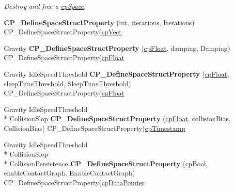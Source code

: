 \begin{DoxyCompactItemize}
\begin{DoxyCompactList}\small\item\em Destroy and free a \hyperlink{structcp_space}{cp\-Space}. \end{DoxyCompactList}\item 
\hypertarget{group__cp_space_ga4416ec77788a87c64524241af22d2913}{{\bfseries C\-P\-\_\-\-Define\-Space\-Struct\-Property} (int, iterations, Iterations) C\-P\-\_\-\-Define\-Space\-Struct\-Property(\hyperlink{structcp_vect}{cp\-Vect}}\label{group__cp_space_ga4416ec77788a87c64524241af22d2913}

\item 
\hypertarget{group__cp_space_ga053a4557b7b4775e12a312dfe5160fb7}{Gravity {\bfseries C\-P\-\_\-\-Define\-Space\-Struct\-Property} (\hyperlink{group__basic_types_gac1ed65573e035bf892505768c852d8d3}{cp\-Float}, damping, Damping) C\-P\-\_\-\-Define\-Space\-Struct\-Property(\hyperlink{group__basic_types_gac1ed65573e035bf892505768c852d8d3}{cp\-Float}}\label{group__cp_space_ga053a4557b7b4775e12a312dfe5160fb7}

\item 
\hypertarget{group__cp_space_gaa3bbaa447a85daca643352590001665b}{Gravity Idle\-Speed\-Threshold {\bfseries C\-P\-\_\-\-Define\-Space\-Struct\-Property} (\hyperlink{group__basic_types_gac1ed65573e035bf892505768c852d8d3}{cp\-Float}, sleep\-Time\-Threshold, Sleep\-Time\-Threshold) C\-P\-\_\-\-Define\-Space\-Struct\-Property(\hyperlink{group__basic_types_gac1ed65573e035bf892505768c852d8d3}{cp\-Float}}\label{group__cp_space_gaa3bbaa447a85daca643352590001665b}

\item 
\hypertarget{group__cp_space_gae071b5bc57f15016fc72bcc6b237f112}{Gravity Idle\-Speed\-Threshold \\*
Collision\-Slop {\bfseries C\-P\-\_\-\-Define\-Space\-Struct\-Property} (\hyperlink{group__basic_types_gac1ed65573e035bf892505768c852d8d3}{cp\-Float}, collision\-Bias, Collision\-Bias) C\-P\-\_\-\-Define\-Space\-Struct\-Property(\hyperlink{group__basic_types_gaa24652c104082d0725066ea5ac7dc83f}{cp\-Timestamp}}\label{group__cp_space_gae071b5bc57f15016fc72bcc6b237f112}

\item 
\hypertarget{group__cp_space_gaa46319f28d43c6d497cc3482f7e28669}{Gravity Idle\-Speed\-Threshold \\*
Collision\-Slop \\*
Collision\-Persistence {\bfseries C\-P\-\_\-\-Define\-Space\-Struct\-Property} (\hyperlink{group__basic_types_gab6e5d8afee598a57cd323abae5310244}{cp\-Bool}, enable\-Contact\-Graph, Enable\-Contact\-Graph) C\-P\-\_\-\-Define\-Space\-Struct\-Property(\hyperlink{group__basic_types_ga2ac2c3c31e21893941f9e4f8ee279447}{cp\-Data\-Pointer}}\label{group__cp_space_gaa46319f28d43c6d497cc3482f7e28669}


\end{DoxyCompactItemize}
